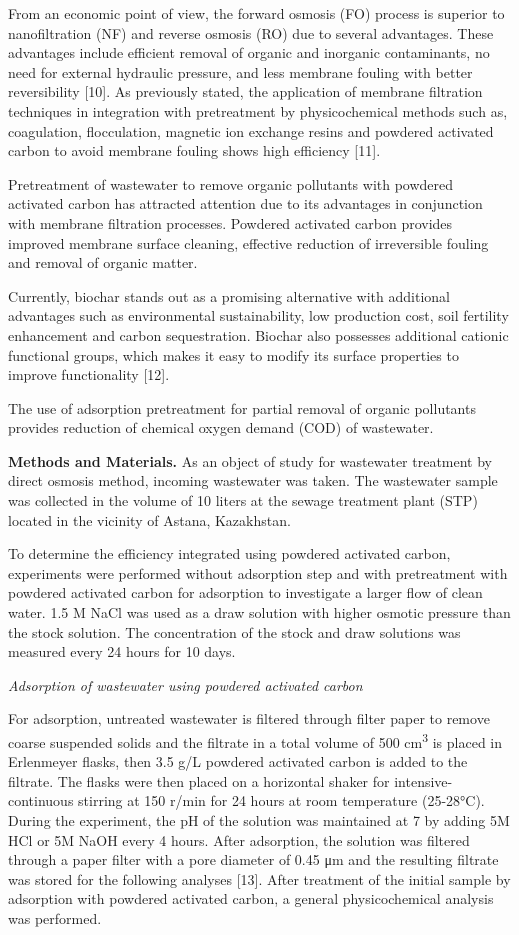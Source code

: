 \begin{multicols}{2}
From an economic point of view, the forward osmosis (FO) process is
superior to nanofiltration (NF) and reverse osmosis (RO) due to several
advantages. These advantages include efficient removal of organic and
inorganic contaminants, no need for external hydraulic pressure, and
less membrane fouling with better reversibility {[}10{]}. As previously
stated, the application of membrane filtration techniques in integration
with pretreatment by physicochemical methods such as, coagulation,
flocculation, magnetic ion exchange resins and powdered activated carbon
to avoid membrane fouling shows high efficiency {[}11{]}.

Pretreatment of wastewater to remove organic pollutants with powdered
activated carbon has attracted attention due to its advantages in
conjunction with membrane filtration processes. Powdered activated
carbon provides improved membrane surface cleaning, effective reduction
of irreversible fouling and removal of organic matter.

Currently, biochar stands out as a promising alternative with additional
advantages such as environmental sustainability, low production cost,
soil fertility enhancement and carbon sequestration. Biochar also
possesses additional cationic functional groups, which makes it easy to
modify its surface properties to improve functionality {[}12{]}.

The use of adsorption pretreatment for partial removal of organic
pollutants provides reduction of chemical oxygen demand (COD) of
wastewater.

{\bfseries Methods and Materials.} As an object of study for wastewater
treatment by direct osmosis method, incoming wastewater was taken. The
wastewater sample was collected in the volume of 10 liters at the sewage
treatment plant (STP) located in the vicinity of Astana, Kazakhstan.

To determine the efficiency integrated using powdered activated carbon,
experiments were performed without adsorption step and with pretreatment
with powdered activated carbon for adsorption to investigate a larger
flow of clean water. 1.5 M NaCl was used as a draw solution with higher
osmotic pressure than the stock solution. The concentration of the stock
and draw solutions was measured every 24 hours for 10 days.

\emph{Adsorption of wastewater using powdered activated carbon}

For adsorption, untreated wastewater is filtered through filter paper to
remove coarse suspended solids and the filtrate in a total volume of 500
cm\textsuperscript{3} is placed in Erlenmeyer flasks, then 3.5 g/L
powdered activated carbon is added to the filtrate. The flasks were then
placed on a horizontal shaker for intensive-continuous stirring at 150
r/min for 24 hours at room temperature (25-28°C). During the experiment,
the pH of the solution was maintained at 7 by adding 5M HCl or 5M NaOH
every 4 hours. After adsorption, the solution was filtered through a
paper filter with a pore diameter of 0.45 μm and the resulting filtrate
was stored for the following analyses {[}13{]}. After treatment of the
initial sample by adsorption with powdered activated carbon, a general
physicochemical analysis was performed.


\end{multicols}
